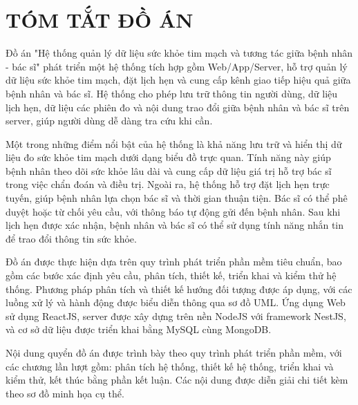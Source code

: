 \section*{TÓM TẮT ĐỒ ÁN}

Đồ án "Hệ thống quản lý dữ liệu sức khỏe tim mạch và tương tác giữa bệnh nhân - bác sĩ" phát triển một hệ thống tích hợp gồm Web/App/Server, hỗ trợ quản lý dữ liệu sức khỏe tim mạch, đặt lịch hẹn và cung cấp kênh giao tiếp hiệu quả giữa bệnh nhân và bác sĩ.
Hệ thống cho phép lưu trữ thông tin người dùng, dữ liệu lịch hẹn, dữ liệu các phiên đo và nội dung trao đổi giữa bệnh nhân và bác sĩ trên server, giúp người dùng dễ dàng tra cứu khi cần.

Một trong những điểm nổi bật của hệ thống là khả năng lưu trữ và hiển thị dữ liệu đo sức khỏe tim mạch dưới dạng biểu đồ trực quan. Tính năng này giúp bệnh nhân theo dõi sức khỏe lâu dài và cung cấp dữ liệu giá trị hỗ trợ bác sĩ trong việc chẩn đoán và điều trị.
Ngoài ra, hệ thống hỗ trợ đặt lịch hẹn trực tuyến, giúp bệnh nhân lựa chọn bác sĩ và thời gian thuận tiện. Bác sĩ có thể phê duyệt hoặc từ chối yêu cầu, với thông báo tự động gửi đến bệnh nhân. Sau khi lịch hẹn được xác nhận, bệnh nhân và bác sĩ có thể sử dụng tính năng nhắn tin để trao đổi thông tin sức khỏe.

Đồ án được thực hiện dựa trên quy trình phát triển phần mềm tiêu chuẩn, bao gồm các bước xác định yêu cầu, phân tích, thiết kế, triển khai và kiểm thử hệ thống. Phương pháp phân tích và thiết kế hướng đối tượng được áp dụng, với các luồng xử lý và hành động được biểu diễn thông qua sơ đồ UML.
Ứng dụng Web sử dụng ReactJS, server được xây dựng trên nền NodeJS với framework NestJS, và cơ sở dữ liệu được triển khai bằng MySQL cùng MongoDB.

Nội dung quyển đồ án được trình bày theo quy trình phát triển phần mềm, với các chương lần lượt gồm: phân tích hệ thống, thiết kế hệ thống, triển khai và kiểm thử, kết thúc bằng phần kết luận. Các nội dung được diễn giải chi tiết kèm theo sơ đồ minh họa cụ thể.

\cleardoublepage



